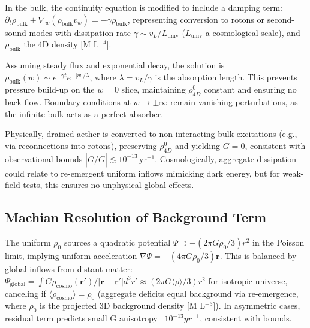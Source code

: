 In the bulk, the continuity equation is modified to include a damping term: $\partial_t \rho_{\text{bulk}} + \nabla_w (\rho_{\text{bulk}} v_w) = -\gamma \rho_{\text{bulk}}$, representing conversion to rotons or second-sound modes with dissipation rate $\gamma \sim v_L / L_{\text{univ}}$ ($L_{\text{univ}}$ a cosmological scale), and $\rho_{\text{bulk}}$ the 4D density [M L$^{-4}$].

Assuming steady flux and exponential decay, the solution is $\rho_{\text{bulk}}(w) \sim e^{-\gamma t} e^{-|w| / \lambda}$, where $\lambda = v_L / \gamma$ is the absorption length. This prevents pressure build-up on the $w=0$ slice, maintaining $\rho_{4D}^0$ constant and ensuring no back-flow. Boundary conditions at $w \to \pm \infty$ remain vanishing perturbations, as the infinite bulk acts as a perfect absorber.

Physically, drained aether is converted to non-interacting bulk excitations (e.g., via reconnections into rotons), preserving $\rho_{4D}^0$ and yielding $\dot{G} = 0$, consistent with observational bounds $|\dot{G}/G| \lesssim 10^{-13} \, \mathrm{yr}^{-1}$. Cosmologically, aggregate dissipation could relate to re-emergent uniform inflows mimicking dark energy, but for weak-field tests, this ensures no unphysical global effects.

\subsection{Machian Resolution of Background Term}

The uniform $\rho_0$ sources a quadratic potential $\Psi \supset - (2\pi G \rho_0 / 3) r^2$ in the Poisson limit, implying uniform acceleration $\nabla \Psi = - (4\pi G \rho_0 / 3) \mathbf{r}$. This is balanced by global inflows from distant matter: $\Psi_{\text{global}} = \int G \rho_{\text{cosmo}}(\mathbf{r}') / |\mathbf{r} - \mathbf{r}'| d^3 r' \approx (2\pi G \langle \rho \rangle / 3) r^2$ for isotropic universe, canceling if $\langle \rho_{\text{cosmo}} \rangle = \rho_0$ (aggregate deficits equal background via re-emergence, where $\rho_0$ is the projected 3D background density [M L$^{-3}$]). In asymmetric cases, residual term predicts small G anisotropy ~$10^{-13} yr^{-1}$, consistent with bounds.


